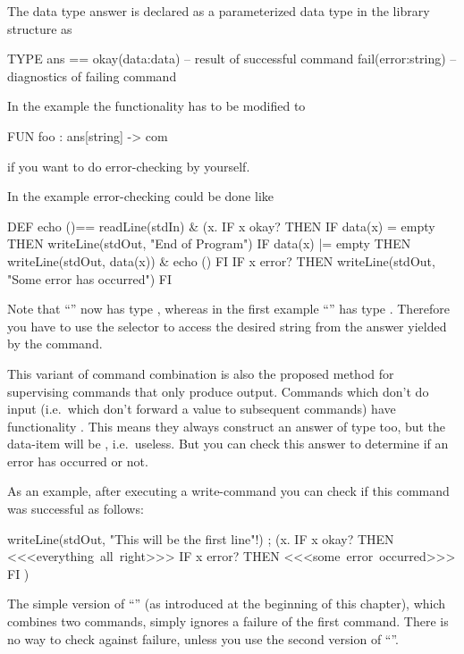 The data type answer is declared as a parameterized data type in the library
structure  as
\begin{prog}
     TYPE ans == okay(data:data)    -- result of successful command
                 fail(error:string) -- diagnostics of failing command
\end{prog}

\noindent In the example  the functionality has to be modified to 
\begin{prog}
        FUN foo : ans[string] -> com
\end{prog}
if you want to do error-checking by yourself.

\medskip
\noindent In the example  error-checking could be done like
\begin{prog}
        DEF echo ()== 
              readLine(stdIn) \&
                (\LAMBDA x.
                   IF x okay? THEN 
                      IF data(x) =  empty THEN 
                                writeLine(stdOut, "End of Program")
                      IF data(x) |= empty THEN 
                                writeLine(stdOut, data(x))
                                  \& echo () FI
                   IF x error? THEN 
                      writeLine(stdOut, "Some error has occurred")
                   FI
\end{prog}
Note that ``'' now has type , whereas in the first
example ``'' has type .
Therefore  you have to use the selector  to access the
desired string from the answer yielded by the command.

\medskip
This variant of command combination is also the proposed method for
supervising  commands that only produce output. 
Commands which don't do input (i.e.~which don't forward a value to
subsequent commands) have functionality .
This means they always construct an answer of type  too, but
the data-item will be , i.e.~useless.
But you can check this answer to determine if an error has occurred or
not.

As an example, after executing a write-command you can check if this
command was successful as follows:
\begin{prog}
  writeLine(stdOut, "This will be the first line"!) ;   (\LAMBDA x.
        IF x okay? THEN <<<\mbox{everything all right}>>>
        IF x error? THEN <<<\mbox{some error occurred}>>>
        FI )
\end{prog}

The simple version of ``\pro{;}'' (as introduced at the beginning of
this chapter),
which combines two commands, simply ignores a failure of the first
command.
There is no way to check against failure, unless you use the second
version of  ``\pro{;}''.
